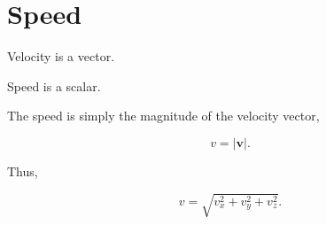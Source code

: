 \section{Speed}

Velocity is a vector.

Speed is a scalar.

The speed is simply the magnitude of the velocity vector,

\[
\boxed{
	v
	=
	|\mathbf v|.
}
\]

Thus,

\[
v
=
\sqrt{
	v_x^2
	+
	v_y^2
	+
	v_z^2
}.
\]

